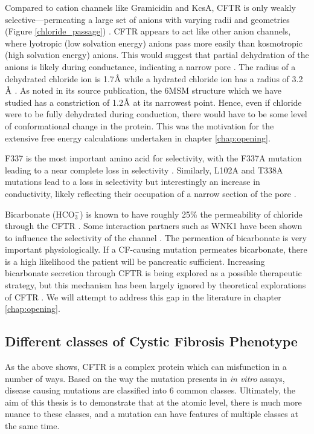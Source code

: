 Compared to cation channels like Gramicidin and KcsA, CFTR is only weakly selective---permeating a large set of anions with varying radii and geometries (Figure \ref{chloride_passage}) \cite{linsdell1998, tabcharani1997, poulsen1994}. CFTR appears to act like other anion channels, where lyotropic (low solvation energy) anions pass more easily than kosmotropic (high solvation energy) anions. This would suggest that partial dehydration of the anions is likely during conductance, indicating a narrow pore \cite{linsdell2000}. The radius of a dehydrated chloride ion is 1.7$\textup{\AA}$ while a hydrated chloride ion has a radius of 3.2$\textup{\AA}$ \cite{yang2002}. As noted in its source publication, the 6MSM structure which we have studied has a constriction of 1.2$\textup{\AA}$ at its narrowest point. Hence, even if chloride were to be fully dehydrated during conduction, there would have to be some level of conformational change in the protein. This was the motivation for the extensive free energy calculations undertaken in chapter \ref{chap:opening}.

F337 is the most important amino acid for selectivity, with the F337A mutation leading to a near complete loss in selectivity \cite{wei2016}. Similarly, L102A and T338A mutations lead to a loss in selectivity but interestingly an increase in conductivity, likely reflecting their occupation of a narrow section of the pore \cite{linsdell2001,ge2004}. 

Bicarbonate (HCO$_3^-$) is known to have roughly 25\% the permeability of chloride through the CFTR \cite{tang2009}. Some interaction partners such as WNK1 have been shown to influence the selectivity of the channel \cite{kim2019, garnett2011, kim2019a}. The permeation of bicarbonate is very important physiologically. If a CF-causing mutation permeates bicarbonate, there is a high likelihood the patient will be pancreatic sufficient. Increasing bicarbonate secretion through CFTR is being explored as a possible therapeutic strategy\cite{ferrera2021}, but this mechanism has been largely ignored by theoretical explorations of CFTR \cite{jun2016}. We will attempt to address this gap in the literature in chapter \ref{chap:opening}.


\subsection{Different classes of Cystic Fibrosis Phenotype}
As the above shows, CFTR is a complex protein which can misfunction in a number of ways. Based on the way the mutation presents in \textit{in vitro} assays, disease causing mutations are classified into 6 common classes. Ultimately, the aim of this thesis is to demonstrate that at the atomic level, there is much more nuance to these classes, and a mutation can have features of multiple classes at the same time.

